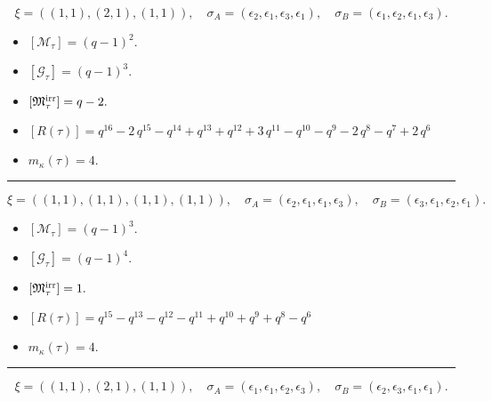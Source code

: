 \documentclass[10pt,a4paper]{amsart}
\begin{document}
$$\xi = ({(1, 1)}, {(2, 1), (1, 1)}),\quad \sigma_A = ({{\epsilon_2}}, {{\epsilon_1, \epsilon_3}, {\epsilon_1}}),\quad \sigma_B = ({{\epsilon_1}}, {{\epsilon_2, \epsilon_1}, {\epsilon_3}}).$$

\begin{itemize}
 \item $[\mathcal{M}_{\tau}] = {\left(q - 1\right)}^{2} .$

 \item $[\mathcal{G}_{\tau}] = {\left(q - 1\right)}^{3} .$

 \item $[{\frak M}_{\tau}^{\textrm{irr}}] = q - 2 .$

 \item $[R(\tau)] = q^{16} - 2 \, q^{15} - q^{14} + q^{13} + q^{12} + 3 \, q^{11} - q^{10} - q^{9} - 2 \, q^{8} - q^{7} + 2 \, q^{6} $

 \item $m_{\kappa}(\tau) = 4 .$

 \end{itemize}
\noindent\rule{8cm}{0.4pt}

$$\xi = ({(1, 1)}, {(1, 1), (1, 1), (1, 1)}),\quad \sigma_A = ({{\epsilon_2}}, {{\epsilon_1}, {\epsilon_1}, {\epsilon_3}}),\quad \sigma_B = ({{\epsilon_3}}, {{\epsilon_1}, {\epsilon_2}, {\epsilon_1}}).$$

\begin{itemize}
 \item $[\mathcal{M}_{\tau}] = {\left(q - 1\right)}^{3} .$

 \item $[\mathcal{G}_{\tau}] = {\left(q - 1\right)}^{4} .$

 \item $[{\frak M}_{\tau}^{\textrm{irr}}] = 1 .$

 \item $[R(\tau)] = q^{15} - q^{13} - q^{12} - q^{11} + q^{10} + q^{9} + q^{8} - q^{6} $

 \item $m_{\kappa}(\tau) = 4 .$

 \end{itemize}
\noindent\rule{8cm}{0.4pt}

$$\xi = ({(1, 1)}, {(2, 1)}, {(1, 1)}),\quad \sigma_A = ({{\epsilon_1}}, {{\epsilon_1, \epsilon_2}}, {{\epsilon_3}}),\quad \sigma_B = ({{\epsilon_2}}, {{\epsilon_3, \epsilon_1}}, {{\epsilon_1}}).$$
\end{document}
